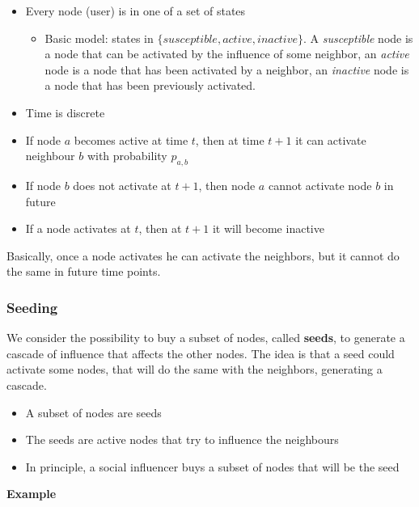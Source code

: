 \documentclass[10pt,a4paper]{article}
\begin{document}
\begin{itemize}
\item Every node (user) is in one of a set of states
\begin{itemize}
\item Basic model: states in $\{susceptible, active, inactive\}$. A \textit{susceptible} node is a node that can be activated by the influence of some neighbor, an \textit{active} node is a node that has been activated by a neighbor, an \textit{inactive} node is a node that has been previously activated.
\end{itemize}
\item Time is discrete
\item If node $a$ becomes active at time $t$, then at time $t+1$ it can activate neighbour $b$ with probability $p_{a,b}$
\item If node $b$ does not activate at $t+1$, then node $a$ cannot activate node $b$ in future
\item If a node activates at $t$, then at $t+1$ it will become inactive
\end{itemize}

Basically, once a node activates he can activate the neighbors, but it cannot do the same in future time points.

\subsubsection{Seeding}\label{seeding}

We consider the possibility to buy a subset of nodes, called \textbf{seeds}, to generate a cascade of influence that affects the other nodes. The idea is that a seed could activate some nodes, that will do the same with the neighbors, generating a cascade.

\begin{itemize}
\item A subset of nodes are seeds
\item The seeds are active nodes that try to influence the neighbours
\item In principle, a social influencer buys a subset of nodes that will be the seed
\end{itemize}

\textbf{Example}
\end{document}
